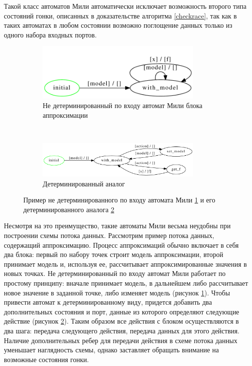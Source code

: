 \documentclass[10pt,a4paper]{article}
\begin{document}
    Такой класс автоматов Мили автоматически исключает возможность второго типа состояний гонки, описанных в доказательстве алгоритма \ref{checkrace}, так
    как в таких автоматах в любом состоянии возможно поглощение данных только из одного набора входных портов.
    
  \begin{figure}[H]
  \centering

  \begin{subfigure}[b]{\textwidth}
    \centering
    \includegraphics[width=0.9\textwidth]{approx_fa.pdf}
    \caption{Не детерминированный по входу автомат Мили блока аппроксимации}
    \label{notdetFA}
  \end{subfigure}
  ~
  \begin{subfigure}[b]{\textwidth}
    \centering
    \includegraphics[width=0.9\textwidth]{approx_fa_det.pdf}
    \caption{Детерминированный аналог}
    \label{detFA}
  \end{subfigure}
  
  \caption{Пример не детерминированного по входу автомата Мили \ref{notdetFA} и его детерминированного аналога \ref{detFA}}
  \label{det_example}
  \end{figure}    
    
    Несмотря на это преимущество, такие автоматы Мили весьма неудобны при построении схемы потока данных.
    Рассмотрим пример потока данных, содержащий аппроксимацию. Процесс аппроксимаций обычно включает в себя два блока:
    первый по набору точек строит модель аппроксимации, второй принимает модель и, используя ее, рассчитывает аппроксимированные значения в новых точках.
    Не детерминированный по входу автомат Мили работает по простому принципу: вначале принимает модель, в дальнейшем либо рассчитывает новое значение в заданной точке,
    либо изменяет модель (рисунок \ref{notdetFA}). Чтобы привести автомат к детерминированному виду, придется добавить два дополнительных состояния и порт, данные из которого
    определяют следующие действие (рисунок \ref{detFA}). Таким образом все действия с блоком осуществляются в два шага: передача следующего действия,
    передача данных для этого действия.
    Наличие дополнительных ребер для передачи действия в схеме потока данных уменьшает наглядность схемы, однако заставляет обращать внимание на возможные состояния гонки.
\end{document}
